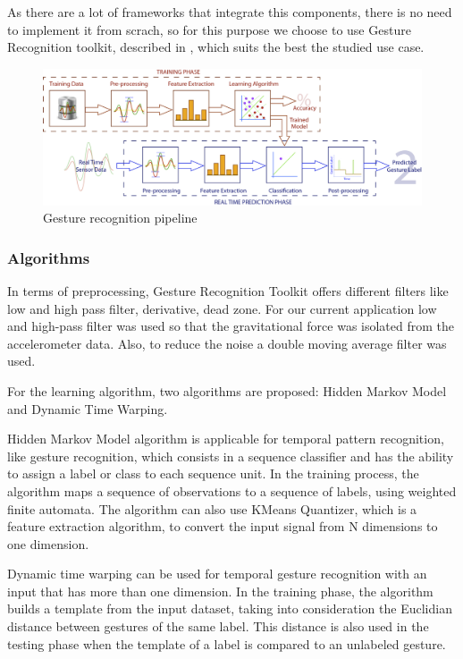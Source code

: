 As there are a lot of frameworks that integrate this components, there is no need to implement it from scrach, so for this purpose we choose to use Gesture Recognition toolkit, described in \cite{Gillian-2014}, which suits the best the studied use case.

\begin{figure}
	\centering\includegraphics[width=12.5cm]{src/img/GestureRecognitionPipelineImage-01.jpg}
	\caption{Gesture recognition pipeline}
	\label{fig:1}
\end{figure}

\subsubsection{Algorithms}
In terms of preprocessing, Gesture Recognition Toolkit offers different filters like low and high pass filter, derivative, dead zone. For our current application low and high-pass filter was used so that the gravitational force was isolated from the accelerometer data. Also, to reduce the noise a double moving average filter was used.

For the learning algorithm, two algorithms are proposed: Hidden Markov Model and Dynamic Time Warping.

Hidden Markov Model algorithm is applicable for temporal pattern recognition, like gesture recognition, which consists in a sequence classifier and has the ability to assign a label or class to each sequence unit. In the training process, the algorithm maps a sequence of observations to a sequence of labels, using weighted finite automata. The algorithm can also use KMeans Quantizer, which is a feature extraction algorithm, to convert the input signal from N dimensions to one dimension.

Dynamic time warping can be used for temporal gesture recognition with an input that has more than one dimension. In the training phase, the algorithm builds a template from the input dataset, taking into consideration the Euclidian distance between gestures of the same label. This distance is also used in the testing phase when the template of a label is compared to an unlabeled gesture.

